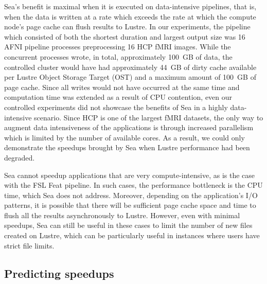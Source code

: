 \documentclass[pdflatex,sn-mathphys-num]{sn-jnl}
\theoremstyle{thmstyleone}%
\theoremstyle{thmstyletwo}%
\theoremstyle{thmstylethree}%
\begin{document}
    Sea's benefit is maximal when it is executed on data-intensive pipelines, that is,
     when the data is written at a rate which exceeds the rate at which the
    compute node's page cache can flush results to Lustre. In our experiments,
    the pipeline which consisted of both the shortest duration and largest
    output size was 16 AFNI pipeline processes preprocessing 16 HCP fMRI images. While the concurrent processes wrote, in total,
    approximately 100~GB of data, the controlled cluster would have had
    approximately 44~GB of dirty cache available per Lustre Object Storage Target (OST) and a maximum amount of
    100~GB of page cache. Since all writes would not have occurred at the same
    time and computation time was extended as a result of CPU contention, even
    our controlled experiments did not showcase the benefits of Sea in a highly
    data-intensive scenario. Since HCP is one of the largest fMRI datasets,
    the only way to augment data intensiveness of the applications is
    through increased parallelism which is limited by the number of available
    cores. As a result, we could only demonstrate the speedups brought by Sea when
    Lustre performance had been degraded.

    Sea cannot speedup applications that are very compute-intensive, as is the case with the FSL Feat pipeline.
    In such cases, the performance bottleneck is the
    CPU time, which Sea does not address. Moreover, depending on the
    application's I/O patterns, it is possible that there will be sufficient
    page cache space and time to flush all the results asynchronously
    to Lustre. However, even with minimal speedups, Sea can still be useful in
    these cases to limit the number of new files created on Lustre, which can be
    particularly useful in instances where users have strict file limits.


    \subsection{Predicting speedups}
\end{document}
